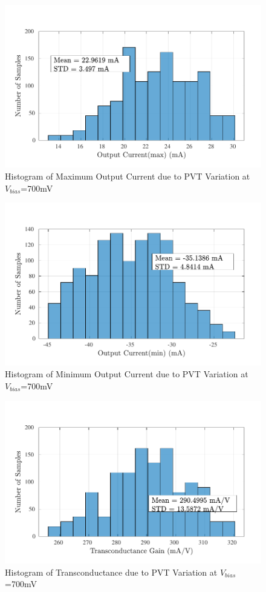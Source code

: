 \begin{figure} [H]
\centering
\includegraphics[scale=1]{Figures/Corners/Overall/PVT_Max/PDFs/PVT_Max_imax.pdf}
\caption{Histogram of Maximum Output Current due to PVT Variation at $V_{bias}$=700mV}
\end{figure}

\begin{figure} [H]
\centering
\includegraphics[scale=1]{Figures/Corners/Overall/PVT_Max/PDFs/PVT_Max_imin.pdf}
\caption{Histogram of Minimum Output Current due to PVT Variation at $V_{bias}$=700mV}
\end{figure}

\begin{figure} [H]
\centering
\includegraphics[scale=1]{Figures/Corners/Overall/PVT_Max/PDFs/PVT_Max_gm.pdf}
\caption{Histogram of Transconductance due to PVT Variation at $V_{bias}$=700mV}
\end{figure}

